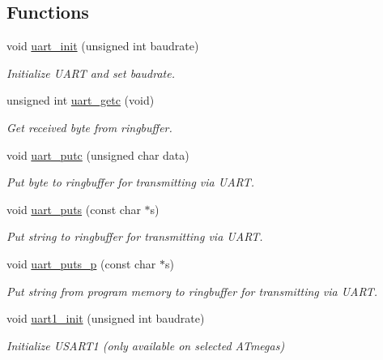 \subsection*{Functions}
\begin{DoxyCompactItemize}
\item 
void \hyperlink{group__pfleury__uart_gac19a76bb7d446125734a67f9f4b68991}{uart\-\_\-init} (unsigned int baudrate)
\begin{DoxyCompactList}\small\item\em Initialize U\-A\-R\-T and set baudrate. \end{DoxyCompactList}\item 
unsigned int \hyperlink{group__pfleury__uart_gaefaab30a8338ec46a6be35b99b1b4f09}{uart\-\_\-getc} (void)
\begin{DoxyCompactList}\small\item\em Get received byte from ringbuffer. \end{DoxyCompactList}\item 
void \hyperlink{group__pfleury__uart_gad975221bc08b901e4c7ad69f9c9a97e2}{uart\-\_\-putc} (unsigned char data)
\begin{DoxyCompactList}\small\item\em Put byte to ringbuffer for transmitting via U\-A\-R\-T. \end{DoxyCompactList}\item 
void \hyperlink{group__pfleury__uart_gae52facc0a56086a365bb0018160d8d71}{uart\-\_\-puts} (const char $\ast$s)
\begin{DoxyCompactList}\small\item\em Put string to ringbuffer for transmitting via U\-A\-R\-T. \end{DoxyCompactList}\item 
void \hyperlink{group__pfleury__uart_ga6d78b6744db6232f52b4616402036c2f}{uart\-\_\-puts\-\_\-p} (const char $\ast$s)
\begin{DoxyCompactList}\small\item\em Put string from program memory to ringbuffer for transmitting via U\-A\-R\-T. \end{DoxyCompactList}\item 
void \hyperlink{group__pfleury__uart_ga4db697cb5469fd70e794fa7df73a6d6a}{uart1\-\_\-init} (unsigned int baudrate)
\begin{DoxyCompactList}\small\item\em Initialize U\-S\-A\-R\-T1 (only available on selected A\-Tmegas) \end{DoxyCompactList}\item 

\end{DoxyCompactItemize}
